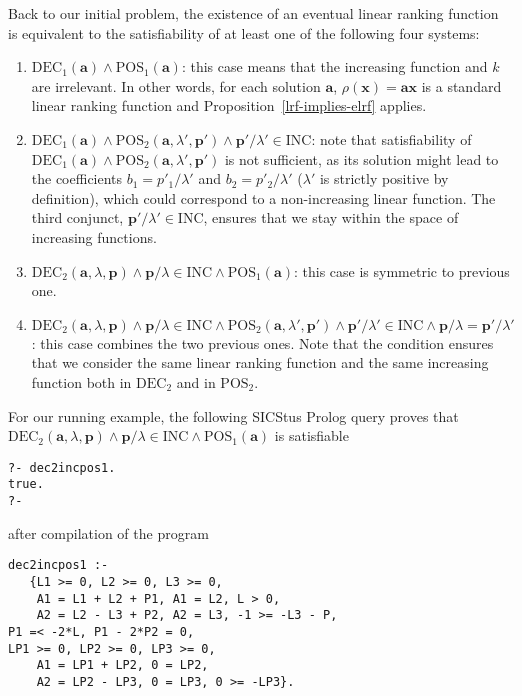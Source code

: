 \documentclass{acm_proc_article-sp}
\newcommand{\dec}{\mathrm{DEC}}
\newcommand{\pos}{\mathrm{POS}}
\newcommand{\inc}{\mathrm{INC}}
\begin{document}
Back to our initial problem, the existence of an eventual linear
ranking function is equivalent to the satisfiability of at least one
of the following four systems:
\begin{enumerate}
\item
$\dec_1(\mathbf{a}) \land \pos_1(\mathbf{a})$:
this case means that the increasing function
and $k$ are irrelevant. In other words, for each solution $\mathbf{a}$,
$\rho(\mathbf{x}) = \mathbf{a}\mathbf{x}$ is a standard linear ranking function
and Proposition~\ref{lrf-implies-elrf} applies.

\item
\(
  \dec_1(\mathbf{a})
    \land \pos_2(\mathbf{a}, \lambda', \mathbf{p'})
    \land \mathbf{p'}/\lambda' \in \inc
\):
note that satisfiability of
$\dec_1(\mathbf{a}) \land \pos_2(\mathbf{a}, \lambda', \mathbf{p'})$
is not sufficient, as its solution might lead to the coefficients
$b_1 = p'_1/\lambda'$ and $b_2=p'_2/\lambda'$
($\lambda'$ is strictly positive by definition),
which could correspond to a non-increasing linear function.
The third conjunct, $\mathbf{p'}/\lambda' \in \inc$,
ensures that we stay within the space of increasing functions.

\item
\(
  \dec_2(\mathbf{a}, \lambda, \mathbf{p})
    \land \mathbf{p}/\lambda \in \inc
    \land \pos_1(\mathbf{a})
\):
this case is symmetric to previous one.

\item
\(
  \dec_2(\mathbf{a},\lambda,\mathbf{p})  \land \mathbf{p}/\lambda \in \inc
    \land \pos_2(\mathbf{a},  \lambda',\mathbf{p'})
    \land \mathbf{p'}/\lambda' \in \inc
    \land \mathbf{p} / \lambda = \mathbf{p'} / \lambda'
\):
this case combines the two previous ones.
Note that the condition ensures that we consider the same linear
ranking function and the same increasing function both in $\dec_2$ and
in $\pos_2$.
\end{enumerate}

For our running example, the following SICStus Prolog query
proves that
\(
  \dec_2(\mathbf{a}, \lambda,\mathbf{p})
    \land \mathbf{p}/\lambda \in \inc
    \land \pos_1(\mathbf{a})
\)
is satisfiable
\begin{verbatim}
?- dec2incpos1.
true.
?-
\end{verbatim}
after compilation of the program
\begin{verbatim}
dec2incpos1 :-
   {L1 >= 0, L2 >= 0, L3 >= 0,
    A1 = L1 + L2 + P1, A1 = L2, L > 0,
    A2 = L2 - L3 + P2, A2 = L3, -1 >= -L3 - P,
P1 =< -2*L, P1 - 2*P2 = 0,
LP1 >= 0, LP2 >= 0, LP3 >= 0,
    A1 = LP1 + LP2, 0 = LP2,
    A2 = LP2 - LP3, 0 = LP3, 0 >= -LP3}.
\end{verbatim}
\end{document}
